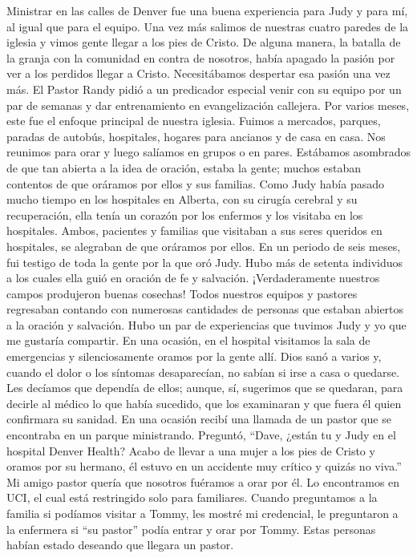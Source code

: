 \documentclass[twoside, 12pt]{book}
\begin{document}
Ministrar en las calles de Denver fue una buena experiencia para Judy y para mí, al igual que para el equipo. Una vez más salimos de nuestras cuatro paredes de la iglesia y vimos gente llegar a los pies de Cristo.  De alguna manera, la batalla de la granja con la comunidad en contra de nosotros, había apagado la pasión por ver a los perdidos llegar a Cristo. Necesitábamos despertar esa pasión una vez más. El Pastor Randy pidió a un predicador especial venir con su equipo por un par de semanas y dar entrenamiento en evangelización callejera. Por varios meses, este fue el enfoque principal de nuestra iglesia. Fuimos a mercados, parques, paradas de autobús, hospitales, hogares para ancianos y de casa en casa. Nos reunimos para orar y luego salíamos en grupos o en pares. Estábamos asombrados de que tan abierta a la idea de oración, estaba la gente; muchos estaban contentos de que oráramos por ellos y sus familias. Como Judy había pasado mucho tiempo en los hospitales en Alberta, con su cirugía cerebral y su recuperación, ella tenía un corazón por los enfermos y los visitaba en los hospitales. Ambos, pacientes y familias que visitaban a sus seres queridos en hospitales, se alegraban de que oráramos por ellos. En un periodo de seis meses, fui testigo de toda la gente por la que oró Judy. Hubo más de setenta individuos a los cuales ella guió en oración de fe y salvación. ¡Verdaderamente nuestros campos produjeron buenas cosechas! Todos nuestros equipos y pastores regresaban contando con numerosas cantidades de personas que estaban abiertos a la oración y salvación. Hubo un par de experiencias que tuvimos Judy y yo que me gustaría compartir. En una ocasión, en el hospital visitamos la sala de emergencias y silenciosamente oramos por la gente allí. Dios sanó a varios y, cuando el dolor o los síntomas desaparecían, no sabían si irse a casa o quedarse. Les decíamos que dependía de ellos; aunque, sí, sugerimos que se quedaran, para decirle al médico lo que había sucedido, que los examinaran y que fuera él quien confirmara su sanidad. En una ocasión recibí una llamada de un pastor que se encontraba en un parque ministrando. Preguntó, “Dave, ¿están tu y Judy en el hospital Denver Health? Acabo de llevar a una mujer a los pies de Cristo y oramos por su hermano, él estuvo en un accidente muy crítico y quizás no viva.” Mi amigo pastor quería que nosotros fuéramos a orar por él. Lo encontramos en UCI, el cual está restringido solo para familiares. Cuando preguntamos a la familia si podíamos visitar a Tommy, les mostré mi credencial, le preguntaron a la enfermera si “su pastor” podía entrar y orar por Tommy. Estas personas habían estado deseando que llegara un pastor.\\
 
\end{document}
